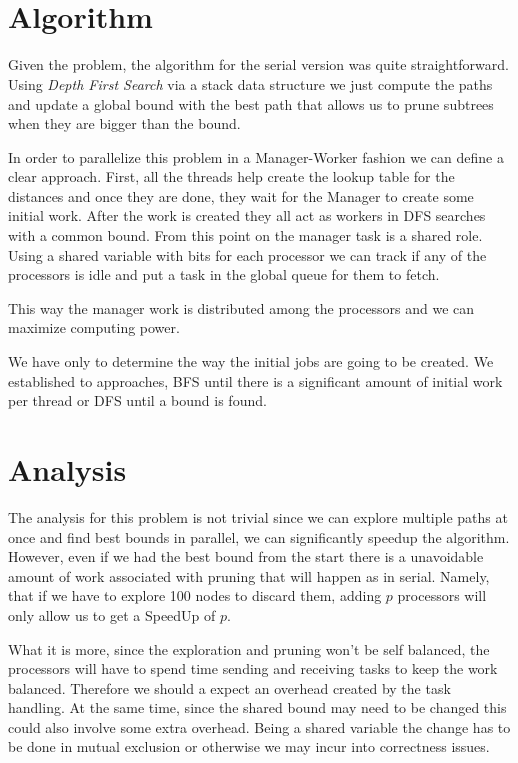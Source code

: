 \documentclass[a4paper]{article}
\title{\HWTitle \\ \vspace{.25cm} \large\HWSubtitle}
\author{\HWAuthorName}
\date{\HWDueDate}
\begin{document}
\maketitle
\thispagestyle{fancy}

\section{Algorithm}
    Given the problem, the algorithm for the serial version was quite straightforward. Using \emph{Depth First Search} via a stack data structure we just compute the paths and update a global bound with the best path that allows us to prune subtrees when they are bigger than the bound.

    In order to parallelize this problem in a Manager-Worker fashion we can define a clear approach. First, all the threads help create the lookup table for the distances and once they are done, they wait for the Manager to create some initial work. After the work is created they all act as workers in DFS searches with a common bound. From this point on the manager task is a shared role. Using a shared variable with bits for each processor we can track if any of the processors is idle and put a task in the global queue for them to fetch.

    This way the manager work is distributed among the processors and we can maximize computing power.

    We have only to determine the way the initial jobs are going to be created. We established to approaches, BFS until there is a significant amount of initial work per thread or DFS until a bound is found.

\section{Analysis}
    The analysis for this problem is not trivial since we can explore multiple paths at once and find best bounds in parallel, we can significantly speedup the algorithm. However, even if we had the best bound from the start there is a unavoidable amount of work associated with pruning that will happen as in serial. Namely, that if we have to explore 100 nodes to discard them, adding $p$ processors will only allow us to get a SpeedUp of $p$.

    What it is more, since the exploration and pruning won't be self balanced, the processors will have to spend time sending and receiving tasks to keep the work balanced. Therefore we should a expect an overhead created by the task handling. At the same time, since the shared bound may need to be changed this could also involve some extra overhead. Being a shared variable the change has to be done in mutual exclusion or otherwise we may incur into correctness issues.
\end{document}
